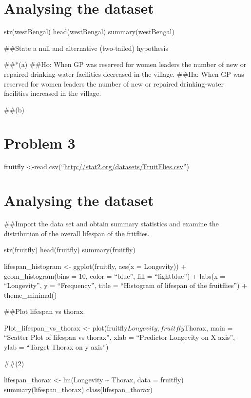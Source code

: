 \documentclass[
]{article}
\begin{document}
\hypertarget{analysing-the-dataset}{%
\section{Analysing the dataset}\label{analysing-the-dataset}}

str(westBengal) head(westBengal) summary(westBengal)

\#\#State a null and alternative (two-tailed) hypothesis

\#\#*(a) \#\#Ho: When GP was reserved for women leaders the number of
new or repaired drinking-water facilities decreased in the village.
\#\#Ha: When GP was reserved for women leaders the number of new or
repaired drinking-water facilities increased in the village.

\#\#(b)

\hypertarget{problem-3}{%
\section{Problem 3}\label{problem-3}}

fruitfly
\textless-read.csv(``\url{http://stat2.org/datasets/FruitFlies.csv}'')

\hypertarget{analysing-the-dataset-1}{%
\section{Analysing the dataset}\label{analysing-the-dataset-1}}

\#\#Import the data set and obtain summary statistics and examine the
distribution of the overall lifespan of the fritflies.

str(fruitfly) head(fruitfly) summary(fruitfly)

lifespan\_histogram \textless- ggplot(fruitfly, aes(x = Longevity)) +
geom\_histogram(bins = 10, color = ``blue'', fill = ``lightblue'') +
labs(x = ``Longevity'', y = ``Frequency'', title = ``Histogram of
lifespan of the fruitflies'') + theme\_minimal()

\#\#Plot lifespan vs thorax.

Plot\_lifespan\_vs\_thorax \textless-
plot(fruitfly\(Longevity, fruitfly\)Thorax, main = ``Scatter Plot of
lifespan vs thorax'', xlab = ``Predictor Longevity on X axis'', ylab =
``Target Thorax on y axis'')

\#\#(2)

lifespan\_thorax \textless- lm(Longevity \textasciitilde{} Thorax, data
= fruitfly) summary(lifespan\_thorax) class(lifespan\_thorax)
\end{document}
